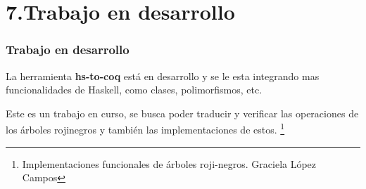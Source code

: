 \documentclass[xcolor=dvipsnames,table,handout]{beamer}
\begin{document}
\section{7.Trabajo en desarrollo}
\begin{frame}
  \frametitle{Trabajo en desarrollo}
  La herramienta \textbf{hs-to-coq} est\'a en desarrollo y se le esta
integrando mas funcionalidades de Haskell, como clases, polimorfismos, etc.

\vspace*{10pt}

  Este es un trabajo en curso, se busca poder traducir y verificar
  las operaciones de los \'arboles rojinegros y tambi\'en las implementaciones
  de estos.
\footnote[frame]{Implementaciones funcionales de árboles roji-negros.
  Graciela López Campos}
\end{frame}
\end{document}
